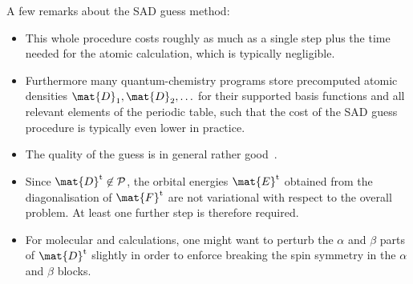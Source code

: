 \noindent
A few remarks about the SAD guess method:
\begin{itemize}
	\item 
	This whole procedure costs roughly as much as a single \SCF step
	plus the time needed for the atomic calculation,
	which is typically negligible.
	\item Furthermore many quantum-chemistry programs
		store precomputed atomic densities $\mat{D}_1, \mat{D}_2, \ldots$
		for their supported basis functions
		and all relevant elements of the periodic table,
		such that the cost of the SAD guess procedure
		is typically even lower in practice.
	\item The quality of the guess is in general rather good~\cite{Lenthe2006}.
	\item
	Since $\mat{D}^\text{t} \not\in \mathcal{P}$,
	the orbital energies $\mat{E}^\text{t}$
	obtained from the diagonalisation
	of $\mat{F}^\text{t}$ are not variational with respect to the
	overall \HF problem.
	At least one further \SCF step is therefore required.
	\item For molecular \UHF and \ROHF calculations,
		one might want to perturb the $\alpha$ and $\beta$
		parts of $\mat{D}^\text{t}$ slightly in order to enforce
		breaking the spin symmetry in the $\alpha$ and $\beta$ blocks.
\end{itemize}
